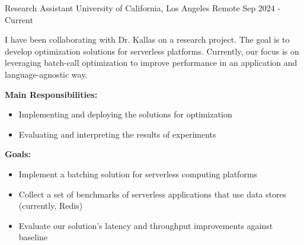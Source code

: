 

\begin{cventries}
  \cventry
  {Research Assistant}
  {University of California, Los Angeles}
  {Remote}
  {Sep 2024 - Current}
  {
    \begin{cvitems}
    \item {I have been collaborating with Dr. Kallas on a research project. The
        goal is to develop optimization solutions for serverless platforms.
        Currently, our focus is on leveraging batch-call optimization to improve
        performance in an application and language-agnostic way.}
    \item {\textbf{Main Responsibilities:}
        \begin{itemize}[label=-]
        \item Implementing and deploying the solutions for optimization
        \item Evaluating and interpreting the results of experiments
        \end{itemize}
      }
    \item {\textbf{Goals:}
        \begin{itemize}[label=-]
        \item Implement a batching solution for serverless computing platforms
        \item Collect a set of benchmarks of serverless applications that use
          data stores (currently, Redis)
        \item Evaluate our solution’s latency and throughput improvements against baseline
        \end{itemize}
      }
    \end{cvitems}
  }


\end{cventries}

